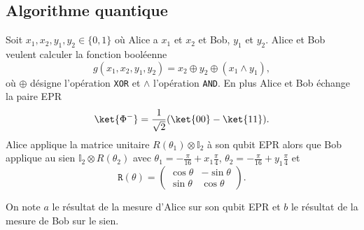 \subsection{Algorithme quantique}

Soit $x_1,x_2,y_1,y_2\in\{0,1\}$ où Alice a $x_1$ et $x_2$ et Bob, $y_1$ et
$y_2$. Alice et Bob veulent calculer la fonction booléenne%
\begin{equation}
g(x_1,x_2,y_1,y_2)=x_2\oplus y_2\oplus(x_1\wedge y_1),
\end{equation}
où $\oplus$ désigne l'opération \texttt{XOR} et $\wedge$ l'opération
\texttt{AND}. En plus Alice et Bob échange la paire EPR%
\begin{equation}
\ket{\Phi^-}=\frac{1}{\sqrt{2}}(\ket{00} -\ket{11}).
\end{equation}
Alice applique la matrice unitaire $R(\theta_1)\otimes\mathbb{I}_2$ à son
qubit EPR alors que Bob applique au sien $\mathbb{I}_2\otimes R(\theta_2)$%
avec $\theta_1=-\frac{\pi}{16}+x_1\frac{\pi}{4}$,
$\theta_2=-\frac{\pi}{16}+y_1\frac{\pi}{4}$ et
\begin{equation}
\mathtt{R}(\theta)=\begin{pmatrix}
\cos\theta & -\sin\theta\\
\sin\theta & \cos\theta
\end{pmatrix}.
\end{equation}

On note $a$ le résultat de la mesure d'Alice sur son qubit EPR et $b$ le
résultat de la mesure de Bob sur le sien.

